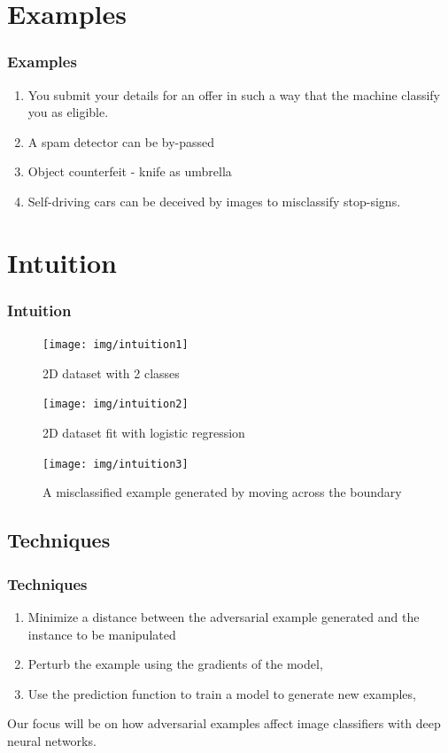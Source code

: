 \documentclass[12pt]{beamer}
\begin{document}
\section{Examples}
\begin{frame}
\frametitle{Examples}
\begin{enumerate}
	\item You submit your details for an offer in such a way that the machine classify you as eligible. \pause
	\item A spam detector can be by-passed \pause
	\item Object counterfeit - knife as umbrella \pause
	\item Self-driving cars can be deceived by images to misclassify stop-signs.
\end{enumerate}
\end{frame}

\section{Intuition}
\begin{frame}
\frametitle{Intuition}
	\begin{figure}
		\centering
		\texttt{[image: img/intuition1]}
		\caption{2D dataset with 2 classes\protect\footnotemark \pause}
		\label{fig:intuition1}
	\end{figure}
\end{frame}

\begin{frame}
\begin{figure}
	\centering
	\texttt{[image: img/intuition2]}
	\caption{2D dataset fit with logistic regression}
	\label{fig:intuition2}
\end{figure}
\end{frame}

\begin{frame}
\begin{figure}
	\centering
	\texttt{[image: img/intuition3]}
	\caption{A misclassified example generated  by moving across the boundary}
	\label{fig:intuition3}
\end{figure}
\end{frame}

\subsection{Techniques}
\begin{frame}
\frametitle{Techniques}
\begin{enumerate}
	\item Minimize a distance between the adversarial example generated and the instance to be manipulated \pause
	\item Perturb the example using the gradients of the model, \pause
	\item Use the prediction function to train a model to generate new examples, \pause
\end{enumerate}
Our focus will be on how adversarial examples affect image classifiers with deep neural networks.
\end{frame}
\end{document}
